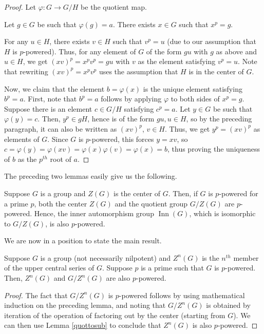 \documentclass{ucetd}
\begin{document}
\begin{proof}
  Let $\varphi:G \to G/H$ be the quotient map.

  Let $g \in G$ be such that $\varphi(g) = a$. There exists $x \in G$ such that $x^p = g$.

  For any $u \in H$, there exists $v \in H$ such that $v^p = u$ (due
  to our assumption that $H$ is $p$-powered). Thus, for any element of
  $G$ of the form $gu$ with $g$ as above and $u \in H$, we get $(xv)^p
  = x^pv^p = gu$ with $v$ as the element satisfying $v^p = u$. Note
  that rewriting $(xv)^p = x^pv^p$ uses the assumption that $H$ is
  in the center of $G$.

  Now, we claim that the element $b = \varphi(x)$ is the unique element
  satisfying $b^p = a$. First, note that $b^p = a$ follows by applying
  $\varphi$ to both sides of $x^p = g$. Suppose there is an element $c \in
  G/H$ satisfying $c^p = a$. Let $y \in G$ be such that $\varphi(y) =
  c$. Then, $y^p \in gH$, hence is of the form $gu, u \in H$, so by
  the preceding paragraph, it can also be written as $(xv)^p$, $v \in
  H$. Thus, we get $y^p = (xv)^p$ as elements of $G$. Since $G$ is
  $p$-powered, this forces $y = xv$, so $c = \varphi(y) = \varphi(xv) =
  \varphi(x)\varphi(v) = \varphi(x) = b$, thus proving the uniqueness of $b$ as
  the $p^{th}$ root of $a$.
\end{proof}

The preceding two lemmas easily give us the following.

\begin{lemma}\label{lemma:inn-aut-is-powering-invariant}
  Suppose $G$ is a group and $Z(G)$ is the center of $G$. Then, if $G$
  is $p$-powered for a prime $p$, both the center $Z(G)$ and the
  quotient group $G/Z(G)$ are $p$-powered. Hence, the inner
  automorphism group $\operatorname{Inn}(G)$, which is isomorphic to
  $G/Z(G)$, is also $p$-powered.
\end{lemma}

We are now in a position to state the main result.

\begin{theorem}\label{ucsqpi}
  Suppose $G$ is a group (not necessarily nilpotent) and $Z^n(G)$ is
  the $n^{th}$ member of the upper central series of $G$. Suppose $p$
  is a prime such that $G$ is $p$-powered. Then, $Z^n(G)$ and
  $G/Z^n(G)$ are also $p$-powered.
\end{theorem}

\begin{proof}
  The fact that $G/Z^n(G)$ is $p$-powered follows by using
  mathematical induction on the preceding lemma, and noting that
  $G/Z^n(G)$ is obtained by iteration of the operation of factoring out by
  the center (starting from $G$). We can then use Lemma
  \ref{quottosub} to conclude that $Z^n(G)$ is also $p$-powered.
\end{proof}
\end{document}
